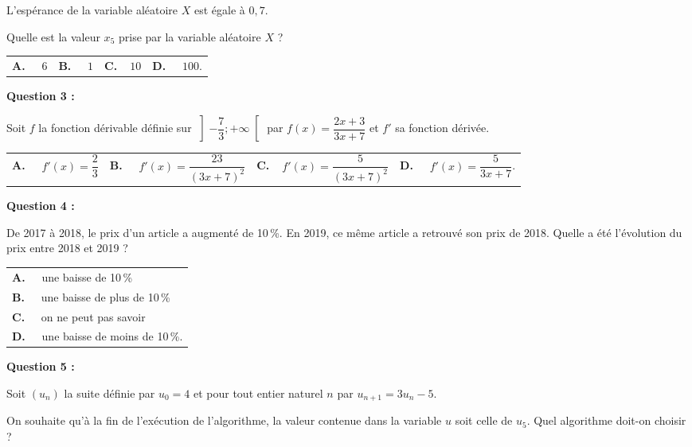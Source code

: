 L’espérance de la variable aléatoire $X$ est égale à $0,7$.

Quelle est la valeur $x_5$ prise par la variable aléatoire $X$ ?


\begin{tabularx}{\linewidth}{*{4}{X}}
\textbf{A.~~} $6$ &\textbf{B.~~} $1$&\textbf{C.~~}$10$& \textbf{D.~~} $100$.
\end{tabularx}

\medskip
 \textbf{Question 3 :}
\medskip

 Soit $f$ la fonction dérivable définie sur $\left]-\dfrac{7}{3} ; +\infty\right[$ par $f(x)= \dfrac{2x+3}{3x+7}$ et $f'$ sa fonction dérivée.
 
 \begin{center}
 \begin{tabularx}{\linewidth}{*{4}{X}}
\textbf{A.~~} $f'(x)=\dfrac{2}{3} $ &\textbf{B.~~} $f'(x) =\dfrac{23}{(3x+7)^2}$&\textbf{C.~~}$f'(x)=\dfrac{5}{(3x+7)^2} $& \textbf{D.~~} $f'(x)=\dfrac{5}{3x+7}$.
\end{tabularx}
 \end{center}
 
\medskip
 \textbf{Question 4 :} 
\medskip

De 2017 à 2018, le prix d’un article a augmenté de 10\,\%. En 2019, ce même article a retrouvé son prix de 2018. Quelle a été l’évolution du prix entre 2018 et 2019 ?

\begin{tabularx}{\linewidth}{*{1}{X}}
\textbf{A.~~} une baisse de 10\,\%\\
\textbf{B.~~} une baisse de plus de 10\,\%\\
\textbf{C.~~} on ne peut pas savoir\\
\textbf{D.~~} une baisse de moins de 10\,\%.\\
\end{tabularx}

\medskip

\textbf{Question 5 :}

\medskip

Soit $\left(u_n\right)$ la suite définie par $u_0 = 4$ et pour tout entier naturel $n$ par $u_{n+1} = 3u_n - 5$.

On souhaite qu'à la fin de l'exécution de l'algorithme, la valeur contenue dans la variable $u$ soit celle de $u_5$. Quel algorithme doit-on choisir ?

\medskip

